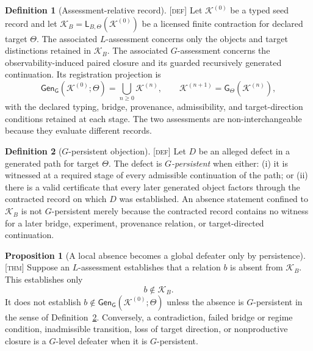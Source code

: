 \documentclass[11pt]{article}
\newcommand{\GOp}{\ensuremath{\mathsf{G}}}
\newcommand{\LOp}{\ensuremath{\mathsf{L}}}
\newcommand{\GenClos}{\ensuremath{\mathsf{Gen}_{\GOp}}}
\newcommand{\Defn}{\textsc{[def]}}
\newcommand{\Thm}{\textsc{[thm]}}
\theoremstyle{definition}
\newtheorem{sdefinition}{Definition}
\newtheorem{sproposition}{Proposition}
\begin{document}
\begin{sdefinition}[Assessment-relative record]
\label{def:assessment-relative-record}
\Defn{} Let $\mathcal K^{(0)}$ be a typed seed record and let
$\mathcal K_B=\LOp_{B,\Theta}(\mathcal K^{(0)})$ be a licensed finite contraction
for declared target $\Theta$. The associated $L$-assessment concerns only the
objects and target distinctions retained in $\mathcal K_B$. The associated
$G$-assessment concerns the observability-induced paired closure
and its guarded recursively generated continuation. Its registration projection is
\begin{equation}
\GenClos(\mathcal K^{(0)};\Theta)=
\bigcup_{n\geq 0}\mathcal K^{(n)},
\qquad
\mathcal K^{(n+1)}=\GOp_{\Theta}\!\left(\mathcal K^{(n)}\right),
\label{eq:assessment-relative-closure}
\end{equation}
with the declared typing, bridge, provenance, admissibility, and target-direction
conditions retained at each stage. The two assessments are non-interchangeable
because they evaluate different records.
\end{sdefinition}

\begin{sdefinition}[$G$-persistent objection]
\label{def:g-persistent-objection}
\Defn{} Let $D$ be an alleged defect in a generated path for target $\Theta$.
The defect is \emph{$G$-persistent} when either: (i) it is witnessed at a required
stage of every admissible continuation of the path; or (ii) there is a valid
certificate that every later generated object factors through the contracted record
on which $D$ was established. An absence statement confined to $\mathcal K_B$ is
not $G$-persistent merely because the contracted record contains no witness for a
later bridge, experiment, provenance relation, or target-directed continuation.
\end{sdefinition}

\begin{sproposition}[A local absence becomes a global defeater only by persistence]
\label{prop:local-absence-persistence}
\Thm{} Suppose an $L$-assessment establishes that a relation $b$ is absent from
$\mathcal K_B$. This establishes only
\begin{equation}
 b\notin \mathcal K_B.
\label{eq:local-absence-only}
\end{equation}
It does not establish $b\notin\GenClos(\mathcal K^{(0)};\Theta)$ unless the
absence is $G$-persistent in the sense of
Definition~\ref{def:g-persistent-objection}. Conversely, a contradiction, failed
bridge or regime condition, inadmissible transition, loss of target direction, or
nonproductive closure is a $G$-level defeater when it is $G$-persistent.
\end{sproposition}
\end{document}
